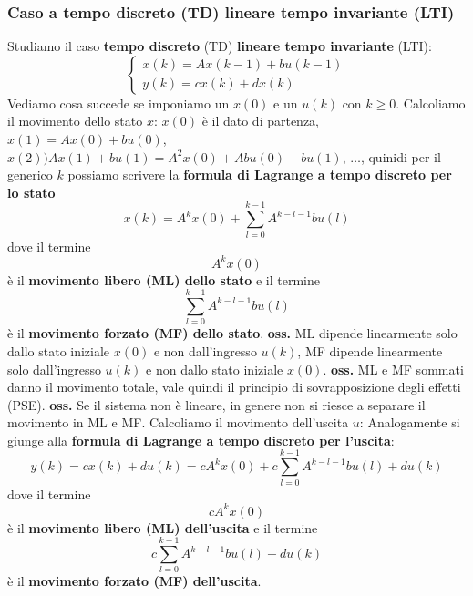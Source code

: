 \subsubsection{Caso a tempo discreto (TD) lineare tempo invariante (LTI)}
Studiamo il caso \textbf{tempo discreto} (TD) \textbf{lineare tempo invariante} (LTI):\newline
\[
    \begin{cases}
        x(k) = A x(k-1) + b u(k-1)\\
        y(k) = cx(k) + dx(k)
    \end{cases}
\]
Vediamo cosa succede se imponiamo un $x(0)$ e un $u(k)$ con $k\geq 0$.\newline
\newline
Calcoliamo il movimento dello stato $x$:\newline
$x(0)$ è il dato di partenza, \newline
$x(1) = Ax(0) + bu(0)$, \newline
$x(2) ) A x(1) + bu(1) = A^2 x(0) + Abu(0) + bu(1)$,\newline
$\dots$,\newline
quinidi per il generico $k$ possiamo scrivere la \textbf{formula di Lagrange a tempo discreto per lo stato}
\[
    x(k) = A^kx(0) + \sum_{l=0}^{k-1}A^{k-l-1}bu(l)
\]
dove il termine
\[
    A^k x(0)
\]
è il \textbf{movimento libero (ML) dello stato} e il termine 
\[
    \sum_{l=0}^{k-1}A^{k-l-1}bu(l)
\]
è il \textbf{movimento forzato (MF) dello stato}.\newline
\newline
\textbf{oss.}  ML dipende linearmente solo dallo stato iniziale $x(0)$ e non dall'ingresso $u(k)$, MF dipende linearmente solo dall'ingresso $u(k)$ e non dallo stato iniziale $x(0)$.\newline
\newline
\textbf{oss.}  ML e MF sommati danno il movimento totale, vale quindi il principio di sovrapposizione degli effetti (PSE).\newline
\newline
\textbf{oss.} Se il sistema non è lineare, in genere non si riesce a separare il movimento in ML e MF. \newline
\newline
Calcoliamo il movimento dell'uscita $u$:\newline
Analogamente si giunge alla \textbf{formula di Lagrange a tempo discreto per l'uscita}:
\[
    y(k) = cx(k) + du(k) = c A^k x(0) + c \sum_{l=0}^{k-1}A^{k-l-1}bu(l) + du(k)
\]
dove il termine
\[
    c A^k x(0)
\]
è il \textbf{movimento libero (ML) dell'uscita} e il termine
\[
    c \sum_{l=0}^{k-1}A^{k-l-1}bu(l) + du(k)
\]
è il \textbf{movimento forzato (MF) dell'uscita}.

